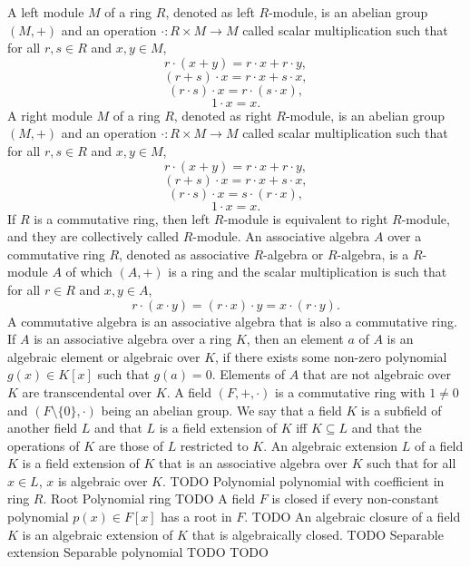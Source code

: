 \documentclass[a4paper,12pt]{article}
\begin{document}
A left module $M$ of a ring $R$, denoted as left $R$-module, is an abelian group $(M,+)$ and an operation $\cdot\colon R\times M\to M$ called scalar multiplication such that for all $r,s\in R$ and $x,y\in M$,
\[r\cdot(x+y)=r\cdot x+r\cdot y,\]
\[(r+s)\cdot x=r\cdot x+s\cdot x,\]
\[(r\cdot s)\cdot x=r\cdot(s\cdot x),\]
\[1\cdot x=x.\]
A right module $M$ of a ring $R$, denoted as right $R$-module, is an abelian group $(M,+)$ and an operation $\cdot\colon R\times M\to M$ called scalar multiplication such that for all $r,s\in R$ and $x,y\in M$,
\[r\cdot(x+y)=r\cdot x+r\cdot y,\]
\[(r+s)\cdot x=r\cdot x+s\cdot x,\]
\[(r\cdot s)\cdot x=s\cdot(r\cdot x),\]
\[1\cdot x=x.\]
If $R$ is a commutative ring, then left $R$-module is equivalent to right $R$-module, and they are collectively called $R$-module.
An associative algebra $A$ over a commutative ring $R$, denoted as associative $R$-algebra or $R$-algebra, is a $R$-module $A$ of which $(A,+)$ is a ring and the scalar multiplication is such that for all $r\in R$ and $x,y\in A$,
\[r\cdot(x\cdot y)=(r\cdot x)\cdot y=x\cdot (r\cdot y).\]
A commutative algebra is an associative algebra that is also a commutative ring.
If $A$ is an associative algebra over a ring $K$, then an element $a$ of $A$ is an algebraic element or algebraic over $K$, if there exists some non-zero polynomial $g(x)\in K[x]$ such that $g(a)=0$. Elements of $A$ that are not algebraic over $K$ are transcendental over $K$.
A field $(F,+,\cdot)$ is a commutative ring with $1\neq 0$ and $(F\setminus\{0\},\cdot)$ being an abelian group.
We say that a field $K$ is a subfield of another field $L$ and that $L$ is a field extension of $K$ iff $K\subseteq L$ and that the operations of $K$ are those of $L$ restricted to $K$.
An algebraic extension $L$ of a field $K$ is a field extension of $K$ that is an associative algebra over $K$ such that for all $x\in L$, $x$ is algebraic over $K$.
TODO
Polynomial
polynomial with coefficient in ring $R$.
Root
Polynomial ring
TODO
A field $F$ is closed if every non-constant polynomial $p(x)\in F[x]$ has a root in $F$.
TODO
An algebraic closure of a field $K$ is an algebraic extension of $K$ that is algebraically closed.
TODO
Separable extension
Separable polynomial
TODO
TODO
\end{document}
